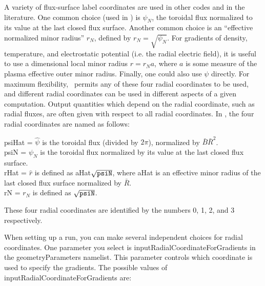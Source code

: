 A variety of flux-surface label coordinates are used in other codes and in the literature.
One common choice (used in \vmec) is $\psi_N$, the toroidal flux normalized to its
value at the last closed flux surface.  Another common choice is an ``effective normalized minor radius''
$r_N$, defined by $r_N=\sqrt{\psi_N}$.  For gradients of density, temperature, and electrostatic potential (i.e. the radial
electric field), it is useful to use a dimensional local minor radius $r = r_N a$, where $a$ is some
measure of the plasma effective outer minor radius.  Finally, one could also use $\psi$ directly.
For maximum flexibility, \sfincs~permits any of these four radial coordinates to be used, and different radial
coordinates can be used in different aspects of a given computation.  Output quantities which depend
on the radial coordinate, such as radial fluxes, are often given with respect to all radial coordinates.
In \sfincs, the four radial coordinates are named as follows:\\

{\setlength{\parindent}{0cm}

{\ttfamily psiHat} = $\hat\psi$ is the toroidal flux (divided by $2\pi$), normalized by $\bar{B}\bar{R}^2$.\\

{\ttfamily psiN} = $\psi_N$ is the toroidal flux normalized by its value at the last closed flux surface.\\

{\ttfamily rHat} = $\hat{r}$ is defined as {\ttfamily aHat}$\sqrt{\mbox{\ttfamily psiN}}$, where {\ttfamily aHat} is an effective minor radius of the last closed flux surface normalized by $\bar{R}$.\\

{\ttfamily rN} = $r_N$ is defined as $\sqrt{\mbox{\ttfamily psiN}}$.\\

}

These four radial coordinates are identified by the numbers 0, 1, 2, and 3 respectively.

When setting up a run, you can make several independent choices for radial coordinates.  One parameter
you select is {\ttfamily inputRadialCoordinateForGradients} in the {\ttfamily geometryParameters} namelist.
This parameter controls which coordinate is used to specify the gradients. The possible values of {\ttfamily inputRadialCoordinateForGradients} are:\\

